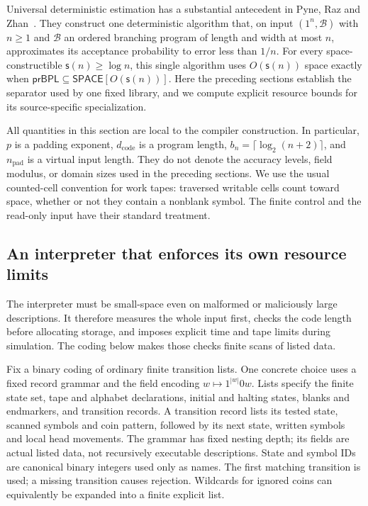 \documentclass[11pt]{article}
\numberwithin{equation}{section}
\theoremstyle{definition}
\theoremstyle{remark}
\begin{document}
Universal deterministic estimation has a substantial antecedent in
Pyne, Raz and Zhan~\cite[full version, Theorem~5.1]{PyneRazZhan2023}.
They construct one deterministic algorithm that, on input $(1^n,\mathcal B)$
with $n\ge1$ and $\mathcal B$ an ordered branching program of length
and width at most $n$, approximates its acceptance probability to error less than
$1/n$. For every space-constructible ${\mathsf{s}}(n)\ge\log n$, this single
algorithm uses $O({\mathsf{s}}(n))$ space exactly when
$\mathsf{prBPL}\subseteq\mathsf{SPACE}[O({\mathsf{s}}(n))]$.
Here the preceding sections establish the separator used by one fixed
library, and we compute explicit resource bounds for its source-specific
specialization.

All quantities in this section are local to the compiler construction.
In particular, ${p}$ is a padding exponent, $d_{\mathrm{code}}$ is a program
length, ${b}_n=\lceil\log_2(n+2)\rceil$, and ${n}_{\mathrm{pad}}$ is a virtual
input length.  They do not denote the accuracy levels, field modulus,
or domain sizes used in the preceding sections.  We use the usual
counted-cell convention for work tapes: traversed writable cells count
toward space, whether or not they contain a nonblank symbol.  The finite
control and the read-only input have their standard treatment.

\subsection{An interpreter that enforces its own resource limits}
\label{subsec:compiler-interpreter}

The interpreter must be small-space even on malformed or maliciously large descriptions. It therefore measures the whole input first, checks the code length before allocating storage, and imposes explicit time and tape limits during simulation. The coding below makes those checks finite scans of listed data.

Fix a binary coding of ordinary finite transition lists.  One concrete
choice uses a fixed record grammar and the field encoding
$w\mapsto 1^{|w|}0w$.  Lists specify the finite state set, tape and
alphabet declarations, initial and halting states, blanks and endmarkers,
and transition records.  A transition record lists its tested state,
scanned symbols and coin pattern, followed by its next state, written
symbols and local head movements.  The grammar has fixed nesting depth;
its fields are actual listed data, not recursively executable descriptions.
State and symbol IDs are canonical binary integers used only as names.
The first matching transition is
used; a missing transition causes rejection.  Wildcards for ignored coins
can equivalently be expanded into a finite explicit list.
\end{document}
